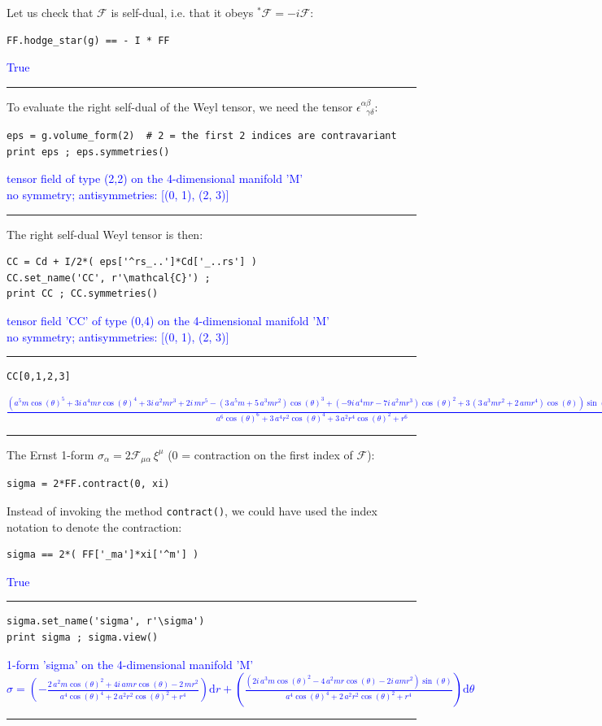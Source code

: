 \documentclass[a4paper]{jpconf}
\newcommand{\code}[1]{\texttt{#1}}
\newcommand{\soutput}[1]{\textcolor{blue}{#1}\\[-0.8ex]\rule{\textwidth}{0.4pt}}
\begin{document}
Let us check that $\mathcal{F}$ is self-dual, i.e. that it obeys ${}^* \mathcal{F} = -i \mathcal{F}$:
\begin{verbatim}
FF.hodge_star(g) == - I * FF
\end{verbatim}
\soutput{True}
To evaluate the right self-dual of the Weyl tensor, we need the 
tensor $\epsilon^{\alpha\beta}_{\ \ \ \gamma\delta}$:
\begin{verbatim}
eps = g.volume_form(2)  # 2 = the first 2 indices are contravariant
print eps ; eps.symmetries()
\end{verbatim}
\soutput{tensor field of type (2,2) on the 4-dimensional manifold 'M'\\
no symmetry;  antisymmetries: [(0, 1), (2, 3)]}
The right self-dual Weyl tensor is then:
\begin{verbatim}
CC = Cd + I/2*( eps['^rs_..']*Cd['_..rs'] )
CC.set_name('CC', r'\mathcal{C}') ; 
print CC ; CC.symmetries()
\end{verbatim}
\soutput{tensor field 'CC' of type (0,4) on the 4-dimensional manifold 'M'\\
no symmetry;  antisymmetries: [(0, 1), (2, 3)]}
\begin{verbatim}
CC[0,1,2,3]
\end{verbatim}
\soutput{$\frac{{\left(a^{5} m \cos\left(\theta\right)^{5} + 3 i \, a^{4} m r
\cos\left(\theta\right)^{4} + 3 i \, a^{2} m r^{3} + 2 i \, m r^{5} -
{\left(3 \, a^{5} m + 5 \, a^{3} m r^{2}\right)}
\cos\left(\theta\right)^{3} + {\left(-9 i \, a^{4} m r - 7 i \, a^{2} m
r^{3}\right)} \cos\left(\theta\right)^{2} + 3 \, {\left(3 \, a^{3} m
r^{2} + 2 \, a m r^{4}\right)} \cos\left(\theta\right)\right)}
\sin\left(\theta\right)}{a^{6} \cos\left(\theta\right)^{6} + 3 \, a^{4}
r^{2} \cos\left(\theta\right)^{4} + 3 \, a^{2} r^{4}
\cos\left(\theta\right)^{2} + r^{6}}$}
The Ernst 1-form $\sigma_\alpha = 2 \mathcal{F}_{\mu\alpha} \, \xi^\mu$ (0 = contraction on the first index of $\mathcal{F}$):
\begin{verbatim}
sigma = 2*FF.contract(0, xi)
\end{verbatim}
Instead of invoking the method \code{contract()}, 
we could have used the index notation to denote the contraction:
\begin{verbatim}
sigma == 2*( FF['_ma']*xi['^m'] )
\end{verbatim}
\soutput{True}
\begin{verbatim}
sigma.set_name('sigma', r'\sigma')
print sigma ; sigma.view()
\end{verbatim}
\soutput{1-form 'sigma' on the 4-dimensional manifold 'M'\\
$\sigma = \left( -\frac{2 \, a^{2} m \cos\left(\theta\right)^{2} + 4 i \,
a m r \cos\left(\theta\right) - 2 \, m r^{2}}{a^{4}
\cos\left(\theta\right)^{4} + 2 \, a^{2} r^{2}
\cos\left(\theta\right)^{2} + r^{4}} \right) \mathrm{d} r + \left(
\frac{{\left(2 i \, a^{3} m \cos\left(\theta\right)^{2} - 4 \, a^{2} m r
\cos\left(\theta\right) - 2 i \, a m r^{2}\right)}
\sin\left(\theta\right)}{a^{4} \cos\left(\theta\right)^{4} + 2 \, a^{2}
r^{2} \cos\left(\theta\right)^{2} + r^{4}} \right) \mathrm{d} \theta$}
\end{document}
